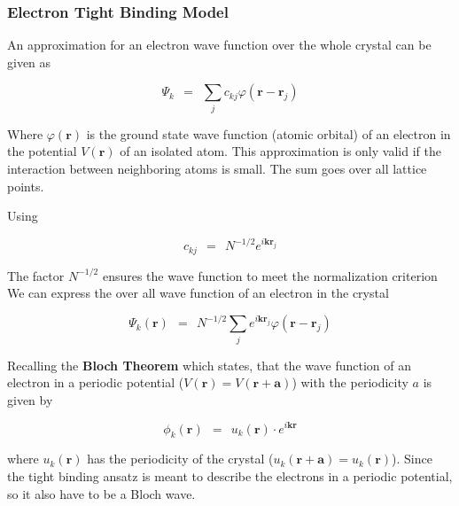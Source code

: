 \documentclass[10pt]{report}
\numberwithin{equation}{chapter}
\begin{document}
\subsubsection{Electron Tight Binding Model}
%



An approximation for an electron wave function over the whole crystal can be given as

\begin{equation}
  \Psi_k ~~=~~ \sum_j c_{kj} \varphi(\mathbf{r}-\mathbf{r}_j)
\end{equation}

Where $\varphi(\mathbf{r})$ is the ground state wave function (atomic orbital) of an electron in the potential $V(\mathbf{r})$ of an isolated atom. This approximation is only valid if the interaction between neighboring atoms is small. The sum goes over all lattice points.


Using

\begin{equation}
  c_{kj} ~~=~~ N^{-1/2} e^{i \mathbf{k} \mathbf{r}_j}
\end{equation}

The factor $N^{-1/2}$ ensures the wave function to meet the normalization criterion
We can express the over all wave function of an electron in the crystal

\begin{equation} \label{eq:el_wf}
  \Psi_k(\mathbf{r}) 
  ~~=~~ N^{-1/2} \sum_j e^{i\mathbf{k} \mathbf{r}_j} \varphi(\mathbf{r} - \mathbf{r}_j)
\end{equation}


Recalling the \textbf{Bloch Theorem} which states, that the wave function of an electron in a periodic potential ($V(\mathbf{r}) = V(\mathbf{r} + \mathbf{a})$) with the periodicity $a$ is given by

\begin{equation} \label{eq:bloch_theorem}
  \phi_k(\mathbf{r}) ~~=~~ u_k(\mathbf{r}) \cdot e^{i\mathbf{k} \mathbf{r}}
\end{equation}

where $u_k(\mathbf{r})$ has the periodicity of the crystal ($u_k(\mathbf{r} + \mathbf{a}) = u_k(\mathbf{r})$). Since the tight binding ansatz is meant to describe the electrons in a periodic potential, so it also have to be a Bloch wave. 
\end{document}
